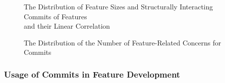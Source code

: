 \clearpage

\begin{figure}[htbp]
  \centering
  
  \caption{The Distribution of Feature Sizes and Structurally Interacting Commits of Features \\ and their Linear Correlation}
  \label{fig:feature_sfbr_plot}
\end{figure}

\clearpage

\begin{figure}[htbp]
  \centering
  
  \caption{The Distribution of the Number of Feature-Related Concerns for Commits}
  \label{fig:commit_sfbr_plot}
\end{figure}

\subsubsection*{Usage of Commits in Feature Development}\label{sec:eval_commit_usage}

